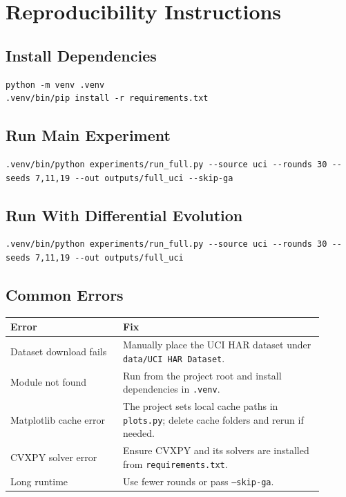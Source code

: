 \documentclass{article}
\begin{document}
\section{Reproducibility Instructions}

\subsection{Install Dependencies}
\begin{lstlisting}[style=textstyle]
python -m venv .venv
.venv/bin/pip install -r requirements.txt
\end{lstlisting}

\subsection{Run Main Experiment}
\begin{lstlisting}[style=textstyle]
.venv/bin/python experiments/run_full.py --source uci --rounds 30 --seeds 7,11,19 --out outputs/full_uci --skip-ga
\end{lstlisting}

\subsection{Run With Differential Evolution}
\begin{lstlisting}[style=textstyle]
.venv/bin/python experiments/run_full.py --source uci --rounds 30 --seeds 7,11,19 --out outputs/full_uci
\end{lstlisting}

\subsection{Common Errors}
\begin{longtable}{p{0.32\linewidth}p{0.58\linewidth}}
\toprule
Error & Fix \\
\midrule
Dataset download fails & Manually place the UCI HAR dataset under \texttt{data/UCI HAR Dataset}. \\
Module not found & Run from the project root and install dependencies in \texttt{.venv}. \\
Matplotlib cache error & The project sets local cache paths in \texttt{plots.py}; delete cache folders and rerun if needed. \\
CVXPY solver error & Ensure CVXPY and its solvers are installed from \texttt{requirements.txt}. \\
Long runtime & Use fewer rounds or pass \texttt{--skip-ga}. \\
\bottomrule
\end{longtable}
\end{document}
